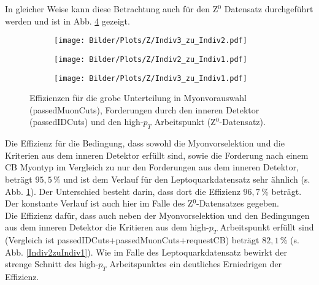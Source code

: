 In gleicher Weise kann diese Betrachtung auch für den Z$^0$ Datensatz durchgeführt werden und ist in Abb. \ref{VorselektionZ} gezeigt.
\begin{figure}
  \begin{subfigure}[t]{0.55\textwidth}
  \texttt{[image: Bilder/Plots/Z/Indiv3\_zu\_Indiv2.pdf]}
  \label{Indiv3zuIndiv2Z}
  \end{subfigure}
\begin{subfigure}[t]{0.55\textwidth}
 \texttt{[image: Bilder/Plots/Z/Indiv2\_zu\_Indiv1.pdf]}
  \label{Indiv2zuIndiv1Z}
\end{subfigure}
\begin{subfigure}[t]{0.55\textwidth}
  \texttt{[image: Bilder/Plots/Z/Indiv3\_zu\_Indiv1.pdf]}
  \label{Indiv3zuIndiv1Z}
\end{subfigure}
\caption{Effizienzen für die grobe Unterteilung in Myonvorauswahl (passedMuonCuts), Forderungen durch den inneren Detektor (passedIDCuts) und den high-$p_T$ Arbeitspunkt (Z$^0$-Datensatz).}
\label{VorselektionZ}
\end{figure} 
Die Effizienz für die Bedingung, dass sowohl die Myonvorselektion und die Kriterien aus dem inneren Detektor erfüllt sind, sowie die Forderung nach einem CB Myontyp im Vergleich zu nur den Forderungen aus dem inneren Detektor, beträgt $95,5\,\%$ und ist dem Verlauf für den Leptoquarkdatensatz sehr ähnlich (s. Abb. \ref{Indiv3zuIndiv2Z}). Der Unterschied besteht darin, dass dort die Effizienz $96,7\,\%$ beträgt. Der konstante Verlauf ist auch hier im Falle des Z$^0$-Datensatzes gegeben.\\
Die Effizienz dafür, dass auch neben der Myonvorselektion und den Bedingungen aus dem inneren Detektor die Kritieren aus dem high-$p_T$ Arbeitspunkt erfüllt sind (Vergleich ist passedIDCuts+passedMuonCuts+requestCB) beträgt $82,1\,\%$ (s. Abb. \ref{Indiv2zuIndiv1}). Wie im Falle des Leptoquarkdatensatz bewirkt der strenge Schnitt des high-$p_T$ Arbeitspunktes ein deutliches Erniedrigen der Effizienz.\\
